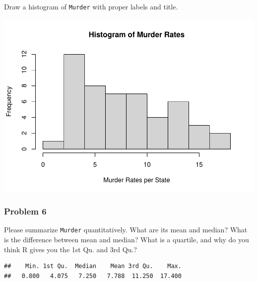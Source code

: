 \documentclass[
]{article}
\newenvironment{Shaded}{\begin{snugshade}}{\end{snugshade}}
\newcommand{\AttributeTok}[1]{\textcolor[rgb]{0.77,0.63,0.00}{#1}}
\newcommand{\FunctionTok}[1]{\textcolor[rgb]{0.00,0.00,0.00}{#1}}
\newcommand{\NormalTok}[1]{#1}
\newcommand{\SpecialCharTok}[1]{\textcolor[rgb]{0.00,0.00,0.00}{#1}}
\newcommand{\StringTok}[1]{\textcolor[rgb]{0.31,0.60,0.02}{#1}}
\begin{document}
Draw a histogram of \texttt{Murder} with proper labels and title.

\begin{Shaded}
\end{Shaded}

\includegraphics{Journal_files/figure-latex/unnamed-chunk-5-1.pdf}

\hypertarget{problem-6}{%
\subsubsection{Problem 6}\label{problem-6}}

Please summarize \texttt{Murder} quantitatively. What are its mean and
median? What is the difference between mean and median? What is a
quartile, and why do you think R gives you the 1st Qu. and 3rd Qu.?

\begin{Shaded}
\end{Shaded}

\begin{verbatim}
##    Min. 1st Qu.  Median    Mean 3rd Qu.    Max. 
##   0.800   4.075   7.250   7.788  11.250  17.400
\end{verbatim}
\end{document}
